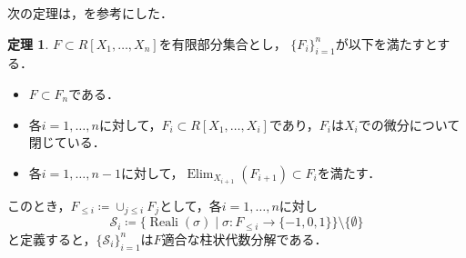 \documentclass[uplatex, dvipdfmx]{jsarticle}
\numberwithin{equation}{section}
\newcommand{\calS}{\mathcal{S}}
\newcommand{\map}[3]{{#1}\colon{#2}\rightarrow{#3}}
\DeclareMathOperator{\Elim}{Elim}
\DeclareMathOperator{\Reali}{Reali}
\theoremstyle{definition}
\newtheorem{theorem}[definition]{定理}
\begin{document}
次の定理は，\cite[Theorem 5.34.]{MR2248869}を参考にした．
\begin{theorem}
     $F \subset R[X_1, \dots, X_n]$を有限部分集合とし，
     $\{F_i\}_{i=1}^n$が以下を満たすとする．
     \begin{itemize}
          \item $F \subset F_n$である．\\
          \item 各$i=1,\dots, n$に対して，$F_i \subset R[X_1, \dots, X_i]$であり，$F_i$は$X_i$での微分について閉じている．\\
          \item 各$i=1, \dots, n-1$に対して，$\Elim_{X_{i+1}}(F_{i+1}) \subset F_i$を満たす．
     \end{itemize}

     このとき，$F_{\leq i}\coloneqq \cup_{j \leq i} F_j$として，各$i=1, \dots, n$に対し
     \begin{equation}
          \calS_i \coloneqq \{\Reali(\sigma) \mid \map{\sigma}{F_{\leq i}}{\{-1,0,1\}}\} \setminus \{\emptyset\}
     \end{equation}          
     と定義すると，$\{\calS_i\}_{i=1}^n$は$F$適合な柱状代数分解である．
\end{theorem}
\end{document}
